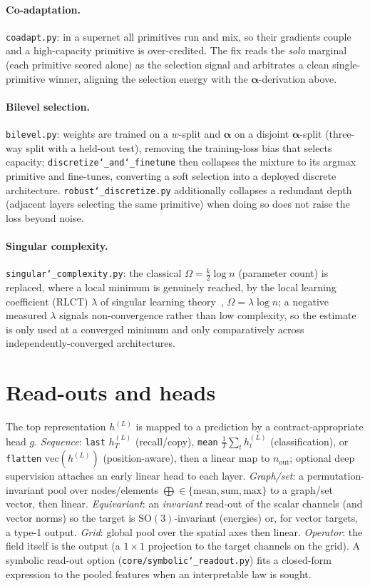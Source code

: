 \documentclass[11pt]{article}
\newcommand{\allowbreakhere}{\discretionary{}{}{}}
\newcommand{\code}[1]{\texttt{\def\_{\char`_\allowbreakhere}#1}}
\newcommand{\alphapar}{\bm{\alpha}}
\newcommand{\SO}{\mathrm{SO}(3)}
\begin{document}
\paragraph{Co-adaptation.} \code{coadapt.py}: in a supernet all primitives run and mix, so their gradients
couple and a high-capacity primitive is over-credited. The fix reads the \emph{solo} marginal (each
primitive scored alone) as the selection signal and arbitrates a clean single-primitive winner, aligning the
selection energy with the $\alphapar$-derivation above.

\paragraph{Bilevel selection.} \code{bilevel.py}: weights are trained on a $w$-split and $\alphapar$ on a
disjoint $\alphapar$-split (three-way split with a held-out test), removing the training-loss bias that
selects capacity; \code{discretize\_and\_finetune} then collapses the mixture to its argmax primitive and
fine-tunes, converting a soft selection into a deployed discrete architecture. \code{robust\_discretize.py}
additionally collapses a redundant depth (adjacent layers selecting the same primitive) when doing so does
not raise the loss beyond noise.

\paragraph{Singular complexity.} \code{singular\_complexity.py}: the classical $\Omega=\tfrac{k}{2}\log n$
(parameter count) is replaced, where a local minimum is genuinely reached, by the local learning coefficient
(RLCT) $\lambda$ of singular learning theory~\cite{watanabe2009slt,lau2023llc}, $\Omega=\lambda\log n$; a negative measured $\lambda$ signals
non-convergence rather than low complexity, so the estimate is only used at a converged minimum and only
comparatively across independently-converged architectures.

\section{Read-outs and heads}
\label{sec:readout}

The top representation $h^{(L)}$ is mapped to a prediction by a contract-appropriate head $g$.
\emph{Sequence}: \code{last} $h^{(L)}_T$ (recall/copy), \code{mean} $\tfrac1T\sum_t h^{(L)}_t$
(classification), or \code{flatten} $\mathrm{vec}(h^{(L)})$ (position-aware), then a linear map to $n_{\mathrm{out}}$;
optional deep supervision attaches an early linear head to each layer. \emph{Graph/set}: a permutation-invariant
pool over nodes/elements $\bigoplus\in\{\text{mean},\text{sum},\text{max}\}$ to a graph/set vector, then linear.
\emph{Equivariant}: an \emph{invariant} read-out of the scalar channels (and vector norms) so the target is
$\SO$-invariant (energies) or, for vector targets, a type-1 output. \emph{Grid}: global pool over the spatial
axes then linear. \emph{Operator}: the field itself is the output (a $1{\times}1$ projection to the target
channels on the grid). A symbolic read-out option (\code{core/symbolic\_readout.py}) fits a closed-form
expression to the pooled features when an interpretable law is sought.
\end{document}
